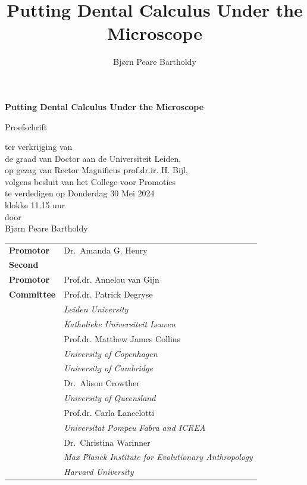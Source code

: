 \documentclass[
  b5paper,
]{book}
\title{Putting Dental Calculus Under the Microscope}
\author{Bjørn Peare Bartholdy}
\date{}
\begin{document}
\clearpage
\thispagestyle{empty}
\begin{center}
\Huge\textbf{Putting Dental Calculus Under the Microscope}\par
\vspace{\baselineskip}
\huge\textit{}\par
\vfill %
    \Large{Proefschrift}\par
    \vspace{\baselineskip}
    \linespread{1.3}
    \large{ter verkrijging van \\
    de graad van Doctor aan de Universiteit Leiden, \\
    op gezag van Rector Magnificus prof.dr.ir. H. Bijl, \\
    volgens besluit van het College voor Promoties \\
    te verdedigen op Donderdag 30 Mei 2024 \\
    klokke 11.15 uur \\[1.5cm]
    door} \\[1.5cm]
    \Large{Bjørn Peare Bartholdy}\par
\end{center}

\clearpage
\thispagestyle{empty}

\noindent\begin{tabular}{p{8em} l}
    \large
    \textbf{Promotor}  & \large Dr.~Amanda G. Henry  \\ 
    \rule{0pt}{4ex}\large\textbf{Second} \\ \large\textbf{Promotor}  & \large Prof.dr.
Annelou van Gijn  \\ 
    \large
    \rule{0pt}{8ex}\textbf{Committee}  & \rule{0pt}{4ex}\large Prof.dr.
Patrick Degryse 
     \\[0.2mm]
    & \indent\textit{Leiden University}  \\[0.2mm]
    & \indent\textit{Katholieke Universiteit
Leuven}  \\  & \rule{0pt}{4ex}\large Prof.dr. Matthew James Collins 
     \\[0.2mm]
    & \indent\textit{University of Copenhagen}  \\[0.2mm]
    & \indent\textit{University of
Cambridge}  \\  & \rule{0pt}{4ex}\large Dr.~Alison Crowther 
     \\[0.2mm]
    & \indent\textit{University of
Queensland}  \\  & \rule{0pt}{4ex}\large Prof.dr. Carla Lancelotti 
     \\[0.2mm]
    & \indent\textit{Universitat Pompeu Fabra and
ICREA}  \\  & \rule{0pt}{4ex}\large Dr.~Christina Warinner 
     \\[0.2mm]
    & \indent\textit{Max Planck Institute for Evolutionary
Anthropology}  \\[0.2mm]
    & \indent\textit{Harvard University}  \\ 
\end{tabular}
\end{document}
